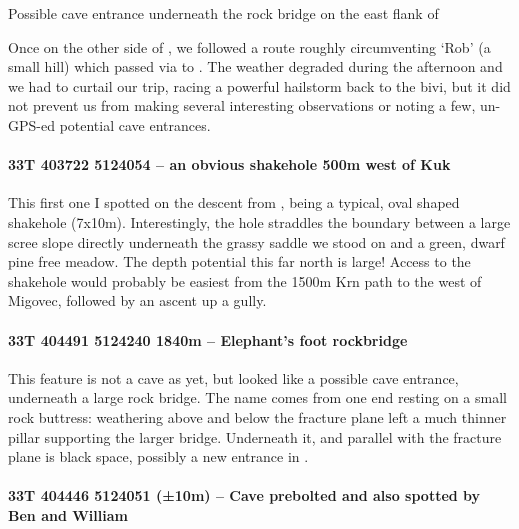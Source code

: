\begin{marginfigure}
        \centering
        
        \caption{Possible cave entrance underneath the rock bridge on the east flank of \protect{}  } \label{rockbridge}
    \end{marginfigure}
    

Once on the other side of , we followed a route roughly circumventing `Rob' (a small hill) which passed via  to . The weather degraded during the afternoon and we had to curtail our trip, racing a powerful hailstorm back to the bivi, but it did not prevent us from making several interesting observations or noting a few, un-GPS-ed potential cave entrances.

\paragraph{33T 403722 5124054 – an obvious shakehole 500m west of Kuk}

This first one I spotted on the descent from , being a typical, oval shaped shakehole (7x10m). Interestingly, the hole straddles the boundary between a large scree slope directly underneath the grassy saddle we stood on and a green, dwarf pine free meadow. The depth potential this far north is large!  Access to the shakehole would probably be easiest from the 1500m Krn path to the west of Migovec, followed by an ascent up a gully. 

\paragraph{33T 404491 5124240  1840m – Elephant's foot rockbridge}


This feature is not a cave as yet, but looked like a possible cave entrance, underneath a large rock bridge. The name comes from one end resting on a small rock buttress: weathering above and below the fracture plane left a much thinner pillar supporting the larger bridge. Underneath it, and parallel with the fracture plane is black space, possibly a new entrance in .

\paragraph{33T 404446 5124051 (±10m) – Cave prebolted and also spotted by Ben and William}

